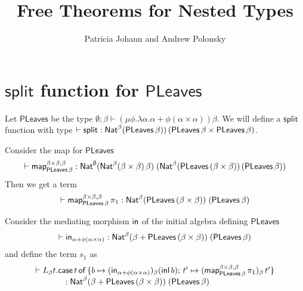 \documentclass[acmsmall,review,anonymous]{acmart}
\title[Free Theorems for Nested Types]{Free Theorems for 
Nested Types} %
\author{Patricia Johann and Andrew Polonsky}
\affiliation{
  \institution{Appalachian State University}            %
}
\theoremstyle{definition}
\newcommand{\map}{\mathsf{map}}
\begin{document}
\newcommand{\tb}[1]{~~ \mbox{#1} ~~}
\newcommand{\listt}[1]{(\mu \phi. \lambda \beta . \onet + \beta \times \phi \beta) #1}
\newcommand{\filtype}{\Nat^\emptyset 
  \, (\Nat^\emptyset \, \alpha \, \mathit{Bool}) (\Nat^\emptyset \, (\GRose\, \psi\, \alpha) \, (\GRose\, \psi\, (\alpha + \onet)))}
\newcommand{\maplist}{\map_{\lambda A. \setsem{\emptyset; \alpha \vdash List \, \alpha} \rho[\alpha := A]}}

\newcommand{\PLeaves}{\mathsf{PLeaves}}
\newcommand{\PLsplit}{\mathsf{split}}

\maketitle

\section{$\PLsplit$ function for $\PLeaves$}

Let $\PLeaves$ be the type $\emptyset; \beta \vdash (\mu \phi. \lambda \alpha. \alpha + \phi(\alpha \times \alpha))\beta$.
We will define a $\PLsplit$ function with type $\vdash \PLsplit : \Nat^{\beta} (\PLeaves\,\beta))\,(\PLeaves\,\beta \times \PLeaves\,\beta)$.

Consider the map for $\PLeaves$
\[
	\vdash \map_{\PLeaves\,\beta}^{\beta \times \beta, \beta}
	: \Nat^{\emptyset}
	(\Nat^{\beta} (\beta \times \beta)\, \beta)\;
	(\Nat^{\beta} (\PLeaves\,(\beta \times \beta))\, (\PLeaves\,\beta))
\]
Then we get a term
\[
	\vdash \map_{\PLeaves\,\beta}^{\beta \times \beta, \beta}\, \pi_1
	: \Nat^{\beta} (\PLeaves\,(\beta \times \beta))\; (\PLeaves\, \beta)
\]

Consider the mediating morphism $\mathsf{in}$ of the initial algebra defining $\PLeaves$
\[
	\vdash \tin_{\alpha + \phi(\alpha \times \alpha)}
	: \Nat^{\beta} (\beta + \PLeaves\,(\beta \times \beta)) \; (\PLeaves\, \beta)
\]
and define the term $s_1$ as
\[
\begin{array}{l}
	\vdash L_{\beta} t. \case{t}{b \mapsto (\tin_{\alpha + \phi(\alpha \times \alpha)})_{\beta} (\inl\, b)}{t' \mapsto (\map_{\PLeaves\,\beta}^{\beta \times \beta, \beta}\, \pi_1)_{\beta}\, t'} \\
	\hspace*{0.5in} : \Nat^{\beta} (\beta + \PLeaves\,(\beta \times \beta))\; (\PLeaves\,\beta)
\end{array}
\]
\end{document}
